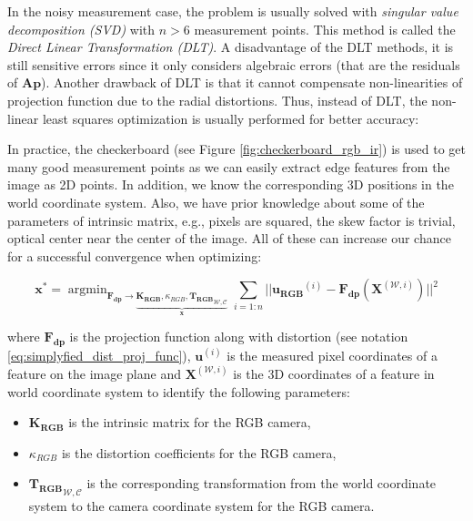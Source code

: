 \documentclass[a4paper]{report}
\numberwithin{figure}{section}
\newcommand{\argmin}{\mathop{\mathrm{argmin}}}
\begin{document}
In the noisy measurement case, the problem is usually solved with 
\textit{singular 
value decomposition (SVD)} with $n > 6$ measurement points.  This method is 
called the \textit{Direct Linear Transformation (DLT)}. A disadvantage of the 
DLT methods, it is still sensitive errors since it only considers algebraic 
errors (that are the residuals of $\mathbf{Ap}$).  Another drawback of DLT is 
that it cannot compensate non-linearities of projection function due to the 
radial distortions.  Thus, instead of DLT, the non-linear least squares 
optimization is usually performed for better accuracy:

In practice, the checkerboard (see Figure \ref{fig:checkerboard_rgb_ir}) 
is 
used to get many good measurement points as 
we can easily extract edge features from the image as 2D points.  In addition, 
we know the corresponding 3D positions in the world coordinate system.
Also, we have prior knowledge about some of the parameters of intrinsic 
matrix, e.g., pixels are squared, the skew factor is trivial, optical center 
near 
the center of the image. All of these can increase our chance for a successful 
convergence when optimizing:

\begin{equation}\label{eq:proj_lsq}
  \mathbf{x^*}
  = 
  \argmin_{\mathbf{F_{dp}} \rightarrow 
  	\underbrace{
  		\mathbf{K_{RGB}}, 
  \kappa_{RGB}, 
  {\mathbf{T_{RGB}}}_{\mathcal{W}, \mathcal{C}}
  }_{\mathbf{x}}
  }
  \sum_{i=1:n} || \mathbf{u_{RGB}}^{(i)} - 
  \mathbf{F_{dp}} (\mathbf{X}^{(\mathcal{W}, i)}) ||^2
\end{equation}

where $\mathbf{F_{dp}}$ is the projection function along with distortion (see 
notation \eqref{eq:simplyfied_dist_proj_func}), $\mathbf{u}^{(i)}$ is the 
measured pixel coordinates of a feature on the image plane and 
$\mathbf{X}^{(\mathcal{W},i)}$ is the 3D coordinates of a feature in world 
coordinate 
system to identify the following parameters:

\begin{itemize}
  \item $\mathbf{K_{RGB}}$ is the intrinsic matrix for the RGB camera, 
  \item $\kappa_{RGB}$ is the distortion coefficients for the RGB camera, 
  \item ${\mathbf{T_{RGB}}}_{\mathcal{W}, \mathcal{C}}$ is the corresponding 
  transformation from the world coordinate system to the camera coordinate 
  system for the RGB camera.
\end{itemize}
\end{document}
